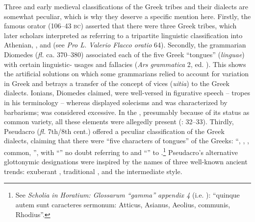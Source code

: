 Three  and early medieval classifications of the Greek tribes and their dialects are somewhat peculiar, which is why they deserve a specific mention here. Firstly, the famous orator  (106–43 \textsc{bc}) asserted that there were three Greek tribes, which later scholars interpreted as referring to a tripartite linguistic classification into Athenian, , and  (see \textit{Pro L. Valerio Flacco oratio} 64). Secondly, the grammarian Diomedes (\textit{fl.} ca. 370–380) associated each of the five Greek “tongues” (\textit{linguae}) with certain linguistic- usages and fallacies (\textit{Ars grammatica} 2, ed. \citealt[440]{Keil1857}). This shows the artificial solutions on which some grammarians relied to account for variation in Greek and betrays a transfer of the  concept of vices (\textit{uitia}) to the Greek dialects. Ionians, Diomedes claimed, were well-versed in figurative speech – tropes in his terminology – whereas  displayed solecisms and  was characterized by barbarisms;  was considered excessive. In the , presumably because of its status as common variety, all these elements were allegedly present (\citealt{Consani1991}: 32–33). Thirdly, Pseudacro (\textit{fl.} 7th/8th cent.) offered a peculiar classification of the Greek dialects, claiming that there were “five characters of tongues” of the Greeks: “, , , common, ”, with “” no doubt referring to  and “” to .\footnote{See \textit{Scholia in Horatium: Glossarum “gamma” appendix 4} (i.e. \citealt[385]{Pseudacro1904}): “quinque autem sunt caracteres sermonum: Atticus, Asianus, Aeolius, communis, Rhodius”.} Pseudacro’s alternative glottonymic designations were inspired by the names of three well-known ancient  trends: exuberant , traditional , and the intermediate  style.

